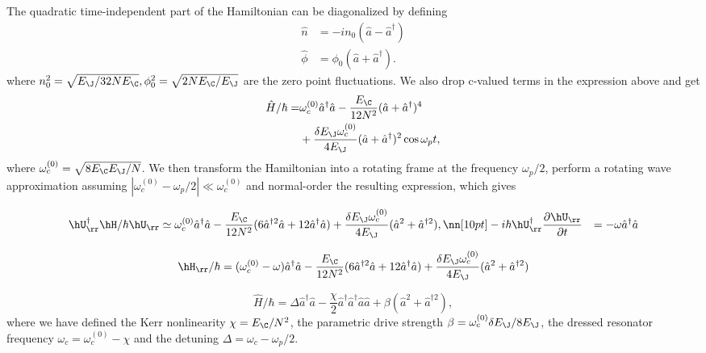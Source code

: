 The quadratic time-independent part of the Hamiltonian can be diagonalized by defining
\begin{align}
\hat{n} &= -i n_0 (\hat{a}-\hat{a}^\dagger) \\
\hat{\phi} &= \phi_0 (\hat{a}+\hat{a}^\dagger).
\end{align}
where $n_0^2 = \sqrt{E_\J/32NE_\C}, \phi_0^2= \sqrt{2NE_\C/E_\J}$ are the zero point fluctuations. We also drop c-valued terms in the expression above and get
\begin{align}
\hat{H}/\hbar =& \omega_c^{(0)} \hat{a}^\dag \hat{a} - \frac{E_\C}{12N^2} (\hat{a} + \hat{a}^\dag)^4 \\
&+ \frac{\delta E_\J \omega_c^{(0)}}{4E_\J} 
(\hat{a}+\hat{a}^\dagger)^2 \cos\omega_p t,
\end{align}
where $\omega_c^{(0)} = \sqrt{8E_\C E_\J/N} $.
We then transform the Hamiltonian into a rotating frame at the frequency $\omega_p/2$, perform a rotating wave approximation assuming $|\omega_c^{(0)} - \omega_p/2| \ll \omega_c^{(0)}$ and normal-order the resulting expression, which gives

\begin{align}
\hU_{\rr}^\dag\hH/\hbar\hU_{\rr} &\simeq \omega_c^{(0)} \hat{a}^\dag \hat{a} 
- \frac{E_\C}{12N^2} (6\hat{a}^{\dag 2}\hat{a}+12\hat{a}^{\dag}\hat{a})
+ \frac{\delta E_\J \omega_c^{(0)}}{4E_\J}(\hat{a}^2+\hat{a}^{\dagger 2}),\nn[10pt]
-i\hbar\hU_{\rr}^\dag\frac{\partial\hU_{\rr}}{\partial t}&=-\omega\hat{a}^\dag\hat{a}
\end{align}

\begin{equation}
    \hH_{\rr}/\hbar=(\omega_c^{(0)}-\omega) \hat{a}^\dag \hat{a} 
- \frac{E_\C}{12N^2} (6\hat{a}^{\dag 2}\hat{a}+12\hat{a}^{\dag}\hat{a})
+ \frac{\delta E_\J \omega_c^{(0)}}{4E_\J}(\hat{a}^2+\hat{a}^{\dagger 2})
\end{equation}

\begin{equation}
\hat{H}/\hbar = \Delta \hat{a}^\dagger\hat{a} - \frac{\chi}{2} \hat{a}^\dagger\hat{a}^\dagger\hat{a}\hat{a} + \beta (\hat{a}^2 + \hat{a}^{\dagger 2}),
\end{equation}
where we have defined the Kerr nonlinearity $\chi =E_\C/N^2$, the parametric drive strength $\beta=\omega_c^{(0)}\delta E_\J/8E_\J$, the dressed resonator frequency $\omega_c=\omega_c^{(0)}-\chi$ and the detuning $\Delta = \omega_c - \omega_p/2$.

